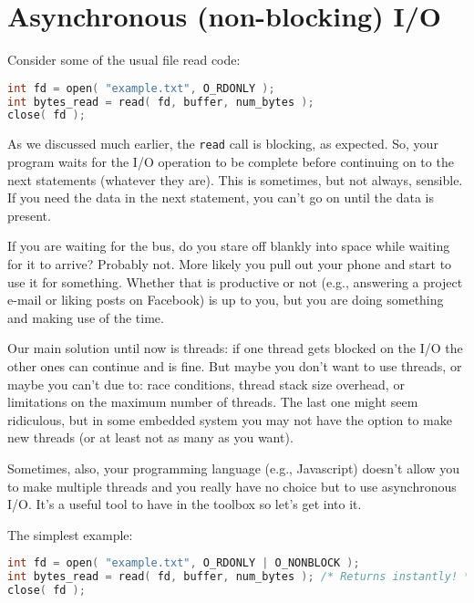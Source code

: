 




\section*{Asynchronous (non-blocking) I/O}
Consider some of the usual file read code:

\begin{lstlisting}[language=C]
int fd = open( "example.txt", O_RDONLY );
int bytes_read = read( fd, buffer, num_bytes );
close( fd );
\end{lstlisting}

As we discussed much earlier, the \texttt{read} call is blocking, as expected. So, your program waits for the I/O operation to be complete before continuing on to the next statements (whatever they are). This is sometimes, but not always, sensible. If you need the data in the next statement, you can't go on until the data is present.

If you are waiting for the bus, do you stare off blankly into space while waiting for it to arrive? Probably not. More likely you pull out your phone and start to use it for something. Whether that is productive or not (e.g., answering a project e-mail or liking posts on Facebook) is up to you, but you are doing something and making use of the time. 

Our main solution until now is threads: if one thread gets blocked on the I/O the other ones can continue and is fine. But maybe you don't want to use threads, or maybe you can't due to: race conditions, thread stack size overhead, or limitations on the maximum number of threads. The last one might seem ridiculous, but in some embedded system you may not have the option to make new threads (or at least not as many as you want). 

Sometimes, also, your programming language (e.g., Javascript) doesn't allow you to make multiple threads and you really have no choice but to use asynchronous I/O. It's a useful tool to have in the toolbox so let's get into it.

The simplest example:

\begin{lstlisting}[language=C]
int fd = open( "example.txt", O_RDONLY | O_NONBLOCK );
int bytes_read = read( fd, buffer, num_bytes ); /* Returns instantly! */
close( fd );
\end{lstlisting}


